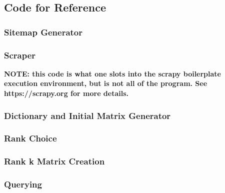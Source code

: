 \subsection{Code for Reference} \label{subsec:codeforRef}

\subsubsection{Sitemap Generator} \label{subsubsec:sitemap}

\subsubsection{Scraper} \label{subsubsec:scraper}
\textbf{NOTE: this code is what one slots into the scrapy boilerplate execution environment, but is not all of the program. See https://scrapy.org for more details. }

\subsubsection{Dictionary and Initial Matrix Generator} \label{subsubsec:dictAndMatrixGen}

\subsubsection{Rank Choice} \label{subsubsec:rankChoiceCode}

\subsubsection{Rank k Matrix Creation} \label{subsubsec:codeRankAppx}

\subsubsection{Querying} \label{subsubsec:codeQuery}



